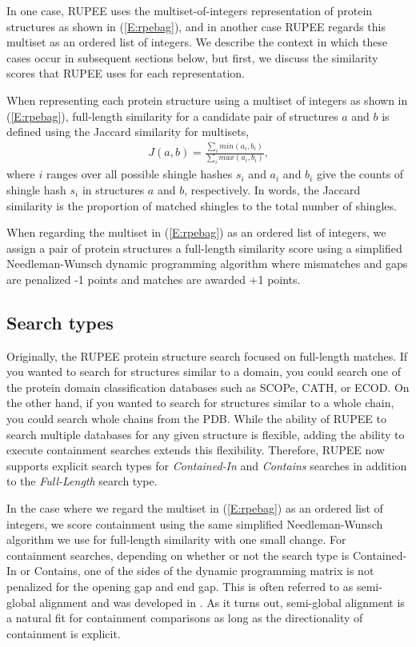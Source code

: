 \documentclass[10pt,letterpaper]{article}
\begin{document}
In one case, RUPEE uses the multiset-of-integers representation of protein structures as shown in (\ref{E:rpebag}), and in another case RUPEE regards this multiset as an ordered list of integers.  
We describe the context in which these cases occur in subsequent sections below, but first, we discuss the similarity scores that RUPEE uses for each representation. 

When representing each protein structure using a multiset of integers as shown in (\ref{E:rpebag}), full-length similarity for a candidate pair of structures $a$ and $b$ is defined using the Jaccard similarity \cite{Levan1971} for multisets,
\begin{align}
    J(a,b) = \frac{\sum_i min(a_i, b_i)}{\sum_i max(a_i,b_i)}\text{,}
\end{align}
where $i$ ranges over all possible shingle hashes $s_i$ and $a_i$ and $b_i$ give the counts of shingle hash $s_i$ in structures $a$ and $b$, respectively. 
In words, the Jaccard similarity is the proportion of matched shingles to the total number of shingles. 

When regarding the multiset in (\ref{E:rpebag}) as an ordered list of integers, we assign a pair of protein structures a full-length similarity score using a simplified Needleman-Wunsch \cite{Needleman1970} dynamic programming algorithm where mismatches and gaps are penalized -1 points and matches are awarded +1 points.

\subsection*{Search types}

Originally, the RUPEE protein structure search focused on full-length matches. 
If you wanted to search for structures similar to a domain, you could search one of the protein domain classification databases such as SCOPe, CATH, or ECOD.
On the other hand, if you wanted to search for structures similar to a whole chain, you could search whole chains from the PDB. 
While the ability of RUPEE to search multiple databases for any given structure is flexible, adding the ability to execute containment searches extends this flexibility.
Therefore, RUPEE now supports explicit search types for \emph{Contained-In} and \emph{Contains} searches in addition to the \emph{Full-Length} search type.

In the case where we regard the multiset in (\ref{E:rpebag}) as an ordered list of integers, we score containment using the same simplified Needleman-Wunsch \cite{Needleman1970} algorithm we use for full-length similarity with one small change. 
For containment searches, depending on whether or not the search type is Contained-In or Contains, one of the sides of the dynamic programming matrix is not penalized for the opening gap and end gap.
This is often referred to as semi-global alignment and was developed in \cite{Brudno2003}. 
As it turns out, semi-global alignment is a natural fit for containment comparisons as long as the directionality of containment is explicit. 
\end{document}
